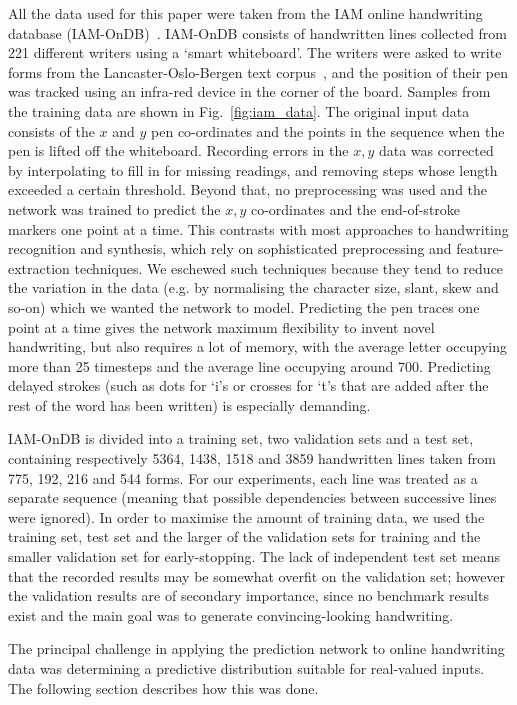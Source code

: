 All the data used for this paper were taken from the IAM online handwriting database (IAM-OnDB)~\cite{liwicki05iam}. IAM-OnDB consists of handwritten lines collected from 221 different writers using a `smart whiteboard'. The writers were asked to write forms from the Lancaster-Oslo-Bergen text corpus~\cite{lob}, and the position of their pen was tracked using an infra-red device in the corner of the board. Samples from the training data are shown in Fig.~\ref{fig:iam_data}.
The original input data consists of the $x$ and $y$ pen co-ordinates and the points in the sequence when the pen is lifted off the whiteboard. Recording errors in the $x, y$ data was corrected by interpolating to fill in for missing readings, and removing steps whose length exceeded a certain threshold. Beyond that, no preprocessing was used and the network was trained to predict the $x, y$ co-ordinates and the end-of-stroke markers one point at a time. This contrasts with most approaches to handwriting recognition and synthesis, which rely on sophisticated preprocessing and feature-extraction techniques. We eschewed such techniques because they tend to reduce the variation in the data (e.g. by normalising the character size, slant, skew and so-on) which we wanted the network to model. Predicting the pen traces one point at a time gives the network maximum flexibility to invent novel handwriting, but also requires a lot of memory, with the average letter occupying more than 25 timesteps and the average line occupying around 700. Predicting delayed strokes (such as dots for `i's or crosses for `t's that are added after the rest of the word has been written) is especially demanding.

IAM-OnDB is divided into a training set, two validation sets and a test set, containing respectively 5364, 1438, 1518 and 3859 handwritten lines taken from 775, 192, 216 and 544 forms. For our experiments, each line was treated as a separate sequence (meaning that possible dependencies between successive lines were ignored). In order to maximise the amount of training data, we used the training set, test set and the larger of the validation sets for training and the smaller validation set for early-stopping. The lack of independent test set means that the recorded results may be somewhat overfit on the validation set; however the validation results are of secondary importance, since no benchmark results exist and the main goal was to generate convincing-looking handwriting.

The principal challenge in applying the prediction network to online handwriting data was determining a predictive distribution suitable for real-valued inputs. The following section describes how this was done.

